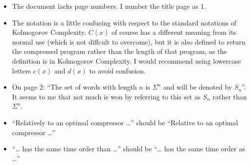 \documentclass{article}
\theoremstyle{definition}
\begin{document}
\begin{itemize}
  \item The document lacks page numbers. I number the title page as 1.
  \item The notation is a little confusing with respect to the standard notations of Kolmogorov Complexity. $C(x)$ of course has a different meaning from its normal use (which is not diffcult to overcome), but it is also defined to return the compressed program rather than the length of that program, as the definition is in Kolmogorov Complexity. I would recommend using lowercase letters $c(x)$ and $d(x)$ to avoid confusion.
  \item On page 2: ``The set of words with length $n$ is $\Sigma^n$ and will be denoted by $S_n$''. It seems to me that not much is won by referring to this set as $S_n$ rather than $\Sigma^n$.
  \item ``Relatively to an optimal compressor \ldots'' should be ``Relative to an optimal compressor \ldots''
  \item ``\ldots{ }has the same time order than \ldots'' should be ``\ldots{ }has the same time order as \ldots''
\end{itemize}
\end{document}

